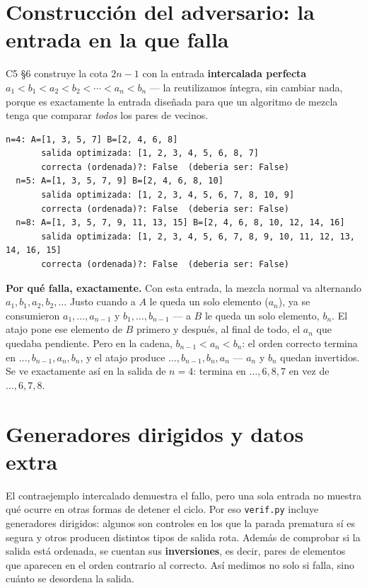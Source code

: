 \documentclass[11pt]{article}
\begin{document}
\section{Construcción del adversario: la entrada en la que falla}\label{sec:adv}

C5 §6 construye la cota $2n{-}1$ con la entrada \textbf{intercalada perfecta}
$a_1<b_1<a_2<b_2<\cdots<a_n<b_n$ --- la reutilizamos íntegra, sin cambiar nada, porque es exactamente la
entrada diseñada para que un algoritmo de mezcla tenga que comparar \emph{todos} los pares de vecinos.

\begin{lstlisting}[style=salida]
  n=4: A=[1, 3, 5, 7] B=[2, 4, 6, 8]
       salida optimizada: [1, 2, 3, 4, 5, 6, 8, 7]
       correcta (ordenada)?: False  (deberia ser: False)
  n=5: A=[1, 3, 5, 7, 9] B=[2, 4, 6, 8, 10]
       salida optimizada: [1, 2, 3, 4, 5, 6, 7, 8, 10, 9]
       correcta (ordenada)?: False  (deberia ser: False)
  n=8: A=[1, 3, 5, 7, 9, 11, 13, 15] B=[2, 4, 6, 8, 10, 12, 14, 16]
       salida optimizada: [1, 2, 3, 4, 5, 6, 7, 8, 9, 10, 11, 12, 13, 14, 16, 15]
       correcta (ordenada)?: False  (deberia ser: False)
\end{lstlisting}

\textbf{Por qué falla, exactamente.} Con esta entrada, la mezcla normal va alternando $a_1,b_1,a_2,b_2,
\dots$ Justo cuando a $A$ le queda un solo elemento ($a_n$), ya se consumieron $a_1,\dots,a_{n-1}$ y
$b_1,\dots,b_{n-1}$ --- a $B$ le queda un solo elemento, $b_n$. El atajo pone ese elemento de
$B$ primero y después, al final de todo, el $a_n$ que quedaba pendiente. Pero en la cadena,
$b_{n-1}<a_n<b_n$: el orden correcto termina en $\dots,b_{n-1},a_n,b_n$, y el atajo produce
$\dots,b_{n-1},b_n,a_n$ --- $a_n$ y $b_n$ quedan invertidos. Se ve exactamente así en la salida de $n=4$:
termina en $\dots,6,8,7$ en vez de $\dots,6,7,8$.

\section{Generadores dirigidos y datos extra}

El contraejemplo intercalado demuestra el fallo, pero una sola entrada no muestra qué ocurre en otras
formas de detener el ciclo. Por eso \texttt{verif.py} incluye generadores dirigidos: algunos son controles
en los que la parada prematura sí es segura y otros producen distintos tipos de salida rota. Además de
comprobar si la salida está ordenada, se cuentan sus \textbf{inversiones}, es decir, pares de elementos que
aparecen en el orden contrario al correcto. Así medimos no solo si falla, sino cuánto se desordena la salida.
\end{document}
